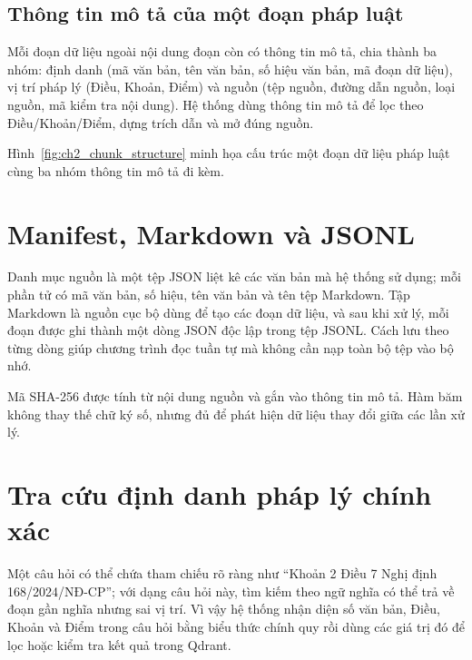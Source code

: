 \documentclass[12pt,a4paper,oneside]{report}
\begin{document}

\subsection{Thông tin mô tả của một đoạn pháp luật}
Mỗi đoạn dữ liệu ngoài nội dung đoạn còn có thông tin mô tả, chia thành ba nhóm: định danh (mã văn bản, tên văn bản, số hiệu văn bản, mã đoạn dữ liệu), vị trí pháp lý (Điều, Khoản, Điểm) và nguồn (tệp nguồn, đường dẫn nguồn, loại nguồn, mã kiểm tra nội dung). Hệ thống dùng thông tin mô tả để lọc theo Điều/Khoản/Điểm, dựng trích dẫn và mở đúng nguồn.

Hình~\ref{fig:ch2_chunk_structure} minh họa cấu trúc một đoạn dữ liệu pháp luật cùng ba nhóm thông tin mô tả đi kèm.

\section{Manifest, Markdown và JSONL}
Danh mục nguồn là một tệp JSON liệt kê các văn bản mà hệ thống sử dụng; mỗi phần tử có mã văn bản, số hiệu, tên văn bản và tên tệp Markdown. Tập Markdown là nguồn cục bộ dùng để tạo các đoạn dữ liệu, và sau khi xử lý, mỗi đoạn được ghi thành một dòng JSON độc lập trong tệp JSONL. Cách lưu theo từng dòng giúp chương trình đọc tuần tự mà không cần nạp toàn bộ tệp vào bộ nhớ.

Mã SHA-256 được tính từ nội dung nguồn và gắn vào thông tin mô tả. Hàm băm không thay thế chữ ký số, nhưng đủ để phát hiện dữ liệu thay đổi giữa các lần xử lý.

\section{Tra cứu định danh pháp lý chính xác}
Một câu hỏi có thể chứa tham chiếu rõ ràng như ``Khoản 2 Điều 7 Nghị định 168/2024/NĐ-CP''; với dạng câu hỏi này, tìm kiếm theo ngữ nghĩa có thể trả về đoạn gần nghĩa nhưng sai vị trí. Vì vậy hệ thống nhận diện số văn bản, Điều, Khoản và Điểm trong câu hỏi bằng biểu thức chính quy rồi dùng các giá trị đó để lọc hoặc kiểm tra kết quả trong Qdrant.
\end{document}

